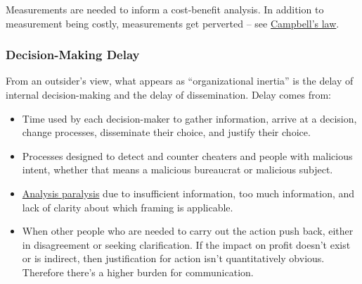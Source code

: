 Measurements are needed to inform a cost-benefit analysis. In addition to measurement being costly, measurements get perverted -- see \href{https://en.wikipedia.org/wiki/Campbell\%27s_law}{Campbell's law}. 

\subsubsection{Decision-Making Delay\label{sec:decision-delay}}

From an outsider's view, what appears as ``organizational inertia'' is the delay of internal decision-making and the delay of dissemination. 
Delay comes from:
\begin{itemize}
    \item Time used by each decision-maker to gather information, arrive at a decision, change processes, disseminate their choice, and justify their choice. 
    \item Processes designed to detect and counter cheaters and people with malicious intent, whether that means a malicious bureaucrat or malicious subject. 
\item \href{https://en.wikipedia.org/wiki/Analysis_paralysis}{Analysis paralysis} 
\iftoggle{WPinmargin}{\marginpar{[Wikipedia] Analysis\\paralysis}}{}
due to insufficient information, too much information, and lack of clarity about which framing is applicable.
\item When other people who are needed to carry out the action push back, either in disagreement or seeking clarification. If the impact on profit doesn't exist or is indirect, then justification for action isn't quantitatively obvious. Therefore there's a higher burden for communication.
\end{itemize}




